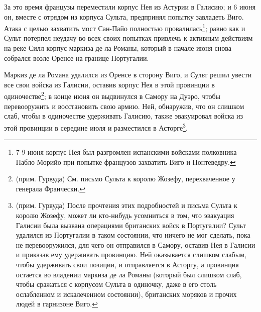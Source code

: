 \documentclass[
  oneside,
  12pt,
  titlepage]{book}
\begin{document}
За это время французы переместили корпус Нея из Астурии в Галисию; и 6 июня он, вместе с отрядом из корпуса Сульта, предпринял попытку завладеть Виго. Атака с целью захватить мост Сан-Пайо полностью провалилась\footnote{7-9 июня корпус Нея был разгромлен испанскими войсками полковника Пабло Морийо при попытке французов захватить Виго и Понтеведру.}; равно как и Сульт потерпел неудачу во всех своих попытках привлечь к активным действиям на реке Силл корпус маркиза де ла Романы, который в начале июня снова собрался возле Оренсе на границе Португалии.

Маркиз де ла Романа удалился из Оренсе в сторону Виго, и Сульт решил увести все свои войска из Галисии, оставив корпус Нея в этой провинции в одиночестве\footnote{(прим. Гурвуда) См. письмо Сульта к королю Жозефу, перехваченное у генерала Франчески.}; в конце июня он выдвинулся в Самору на Дуэро, чтобы перевооружить и восстановить свою армию. Ней, обнаружив, что он слишком слаб, чтобы в одиночестве удерживать Галисию, также эвакуировал войска из этой провинции в середине июля и разместился в Асторге\footnote{(прим. Гурвуда) После прочтения этих подробностей и письма Сульта к королю Жозефу, может ли кто-нибудь усомниться в том, что эвакуация Галисии была вызвана операциями британских войск в Португалии? Сульт удалился из Португалии в таком состоянии, что ничего не мог сделать, пока не перевооружился, для чего он отправился в Самору, оставив Нея в Галисии и приказав ему удерживать провинцию. Ней оказывается слишком слабым, чтобы удерживать свои позиции, и отправляется в Асторгу, а провинция остается во владении маркиза де ла Романы (который был слишком слаб, чтобы сражаться с корпусом Сульта в одиночку, даже в его столь ослабленном и искалеченном состоянии), британских моряков и прочих людей в гарнизоне Виго.}.
\end{document}
